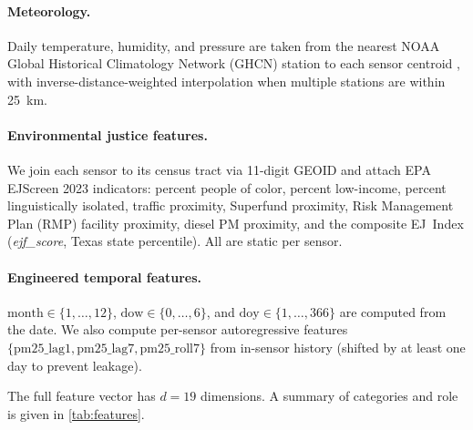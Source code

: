 \documentclass{article}
\begin{document}
\paragraph{Meteorology.} Daily temperature, humidity, and pressure are taken from the nearest NOAA Global Historical Climatology Network (GHCN) station to each sensor centroid \citep{menne2012ghcn}, with inverse-distance-weighted interpolation when multiple stations are within \SI{25}{\kilo\meter}.

\paragraph{Environmental justice features.} We join each sensor to its census tract via 11-digit GEOID and attach EPA EJScreen \num{2023} indicators: percent people of color, percent low-income, percent linguistically isolated, traffic proximity, Superfund proximity, Risk Management Plan (RMP) facility proximity, diesel PM proximity, and the composite EJ~Index (\emph{ejf\_score}, Texas state percentile). All are static per sensor.

\paragraph{Engineered temporal features.} $\mathrm{month} \in \{1,\dots,12\}$, $\mathrm{dow} \in \{0,\dots,6\}$, and $\mathrm{doy} \in \{1,\dots,366\}$ are computed from the date. We also compute per-sensor autoregressive features $\{\mathrm{pm25\_lag1}, \mathrm{pm25\_lag7}, \mathrm{pm25\_roll7}\}$ from in-sensor history (shifted by at least one day to prevent leakage).

The full feature vector has $d=19$ dimensions. A summary of categories and role is given in \autoref{tab:features}.
\end{document}
